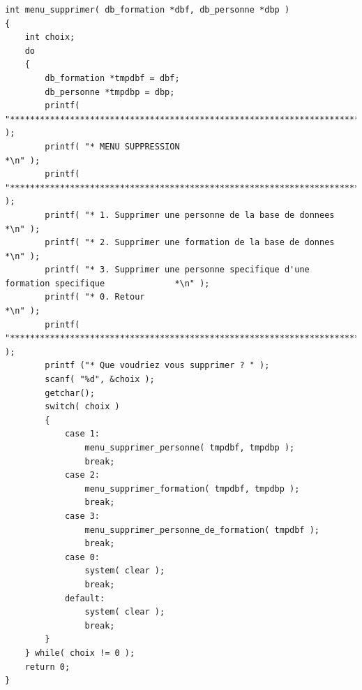 \documentclass[11pt]{article}
\begin{document}
\begin{lstlisting}
int menu_supprimer( db_formation *dbf, db_personne *dbp )
{
    int choix;
    do
    {
        db_formation *tmpdbf = dbf;
        db_personne *tmpdbp = dbp;
        printf( "********************************************************************************\n" );
        printf( "* MENU SUPPRESSION                                                             *\n" );
        printf( "********************************************************************************\n" );
        printf( "* 1. Supprimer une personne de la base de donnees                              *\n" );
        printf( "* 2. Supprimer une formation de la base de donnes                              *\n" );
        printf( "* 3. Supprimer une personne specifique d'une formation specifique              *\n" );
        printf( "* 0. Retour                                                                    *\n" );
        printf( "********************************************************************************\n" );
        printf ("* Que voudriez vous supprimer ? " );
        scanf( "%d", &choix );
        getchar();
        switch( choix )
        {
            case 1:
                menu_supprimer_personne( tmpdbf, tmpdbp );
                break;
            case 2:
                menu_supprimer_formation( tmpdbf, tmpdbp );
                break;
            case 3:
                menu_supprimer_personne_de_formation( tmpdbf );
                break;
            case 0:
                system( clear );
                break;
            default:
                system( clear );
                break;
        }
    } while( choix != 0 );
    return 0;
}


\end{lstlisting}
\end{document}
